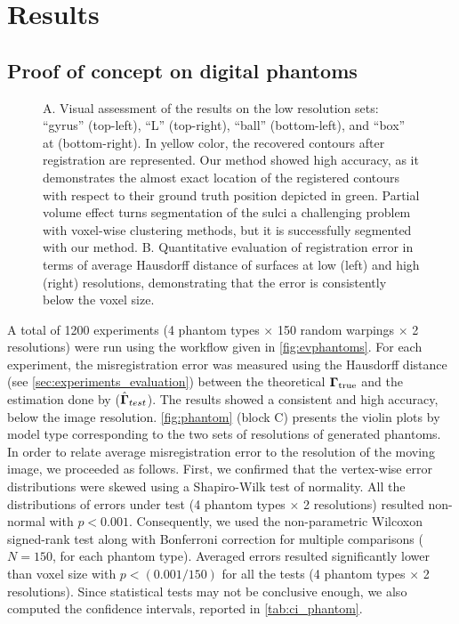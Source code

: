 \section{Results}
\label{sec:results}

\subsection{Proof of concept on digital phantoms}
\label{sec:results_phantom}

\begin{figure*}
  \centering
  
  \caption{A. Visual assessment of the results on the low resolution sets:
    ``gyrus'' (top-left), ``L'' (top-right), ``ball'' (bottom-left),
    and ``box'' at (bottom-right).
  In yellow color, the recovered contours after registration are represented.
  Our method showed high accuracy, as it demonstrates the almost exact location of the registered
    contours with respect to their ground truth position depicted in green.
  Partial volume effect turns segmentation of the sulci a challenging problem with voxel-wise
    clustering methods, but it is successfully segmented with our method.
  B. Quantitative evaluation of registration error in terms of average Hausdorff distance of
    surfaces at low (left) and high (right) resolutions, demonstrating that the error is
    consistently below the voxel size.
    }\label{fig:phantom}
\end{figure*}
A total of 1200 experiments (4 phantom types $\times$ 150 random warpings $\times$ 2 resolutions) were
  run using the workflow given in \autoref{fig:evphantoms}.
For each experiment, the misregistration error was measured using the Hausdorff distance
  (see \autoref{sec:experiments_evaluation}) between the theoretical $\boldsymbol{\Gamma}_\text{true}$ and
  the estimation done by \regseg{} ($\hat{\boldsymbol{\Gamma}}_{test}$).
The results showed a consistent and high accuracy, below the image resolution.
\autoref{fig:phantom} (block C) presents the violin plots by model type corresponding
  to the two sets of resolutions of generated phantoms.
In order to relate average misregistration error to the resolution of the moving image,
  we proceeded as follows.
First, we confirmed that the vertex-wise error distributions were skewed using a Shapiro-Wilk test of
  normality.
All the distributions of errors under test (4 phantom types $\times$ 2 resolutions) resulted
  non-normal with $p<0.001$.
Consequently, we used the non-parametric Wilcoxon signed-rank test along with Bonferroni
  correction for multiple comparisons ($N=150$, for each phantom type).
Averaged errors resulted significantly lower than voxel size with $p < (0.001 / 150)$
  for all the tests (4 phantom types $\times$ 2 resolutions).
Since statistical tests may not be conclusive enough, we also computed the confidence intervals,
  reported in \autoref{tab:ci_phantom}.


